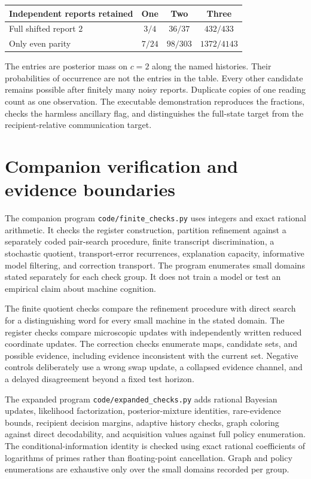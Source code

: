 \documentclass[11pt,letterpaper]{article}
\theoremstyle{plain}
\theoremstyle{definition}
\newcommand{\code}[1]{\texttt{\small #1}}
\begin{document}
\begin{center}
\begin{tabular}{@{}lccc@{}}\toprule
Independent reports retained & One & Two & Three\\\midrule
Full shifted report $2$ & $3/4$ & $36/37$ & $432/433$\\
Only even parity & $7/24$ & $98/303$ & $1372/4143$\\\bottomrule
\end{tabular}
\end{center}
The entries are posterior mass on $c=2$ along the named histories. Their probabilities of occurrence are not the entries in the table. Every other candidate remains possible after finitely many noisy reports. Duplicate copies of one reading count as one observation. The executable demonstration reproduces the fractions, checks the harmless ancillary flag, and distinguishes the full-state target from the recipient-relative communication target.

\section{Companion verification and evidence boundaries}\label{app:verification}
The companion program \code{code/finite\_checks.py} uses integers and exact rational arithmetic. It checks the register construction, partition refinement against a separately coded pair-search procedure, finite transcript discrimination, a stochastic quotient, transport-error recurrences, explanation capacity, informative model filtering, and correction transport. The program enumerates small domains stated separately for each check group. It does not train a model or test an empirical claim about machine cognition.

The finite quotient checks compare the refinement procedure with direct search for a distinguishing word for every small machine in the stated domain. The register checks compare microscopic updates with independently written reduced coordinate updates. The correction checks enumerate maps, candidate sets, and possible evidence, including evidence inconsistent with the current set. Negative controls deliberately use a wrong swap update, a collapsed evidence channel, and a delayed disagreement beyond a fixed test horizon.

The expanded program \code{code/expanded\_checks.py} adds rational Bayesian updates, likelihood factorization, posterior-mixture identities, rare-evidence bounds, recipient decision margins, adaptive history checks, graph coloring against direct decodability, and acquisition values against full policy enumeration. The conditional-information identity is checked using exact rational coefficients of logarithms of primes rather than floating-point cancellation. Graph and policy enumerations are exhaustive only over the small domains recorded per group.
\end{document}
